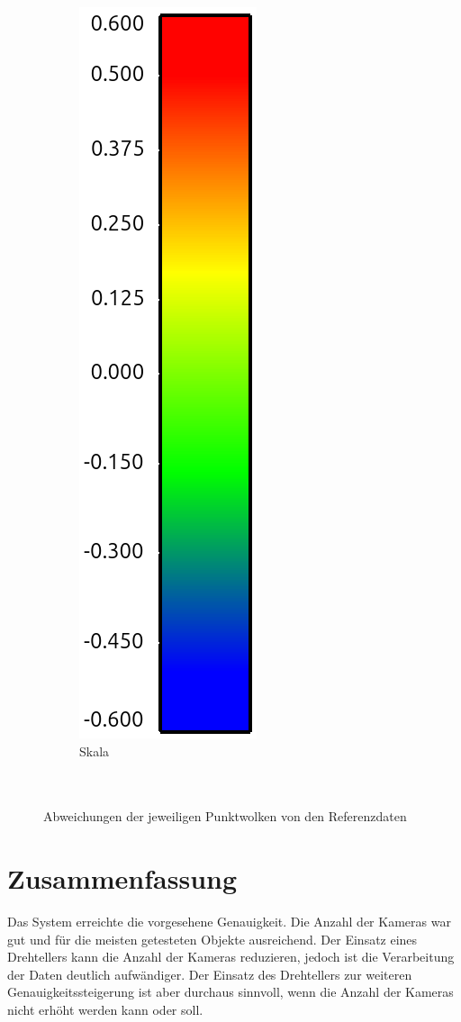 \documentclass[./00PhotoBox.tex]{subfiles}
\begin{document}
\begin{figure}
\begin{subfigure}{0.30\textwidth}
        \includegraphics[width=0.33\linewidth]{img/cam_anzahl/scala.png}
        \caption{Skala\\~\\~}
    \end{subfigure}

    \caption{Abweichungen der jeweiligen Punktwolken von den Referenzdaten}
    \label{img:ueberblick_cam_anzahl}
\end{figure}


\section{Zusammenfassung}
Das System erreichte die vorgesehene Genauigkeit. Die Anzahl der Kameras war gut und für die meisten getesteten Objekte ausreichend. Der Einsatz eines Drehtellers kann die Anzahl der Kameras reduzieren, jedoch ist die Verarbeitung der Daten deutlich aufwändiger. Der Einsatz des Drehtellers zur weiteren Genauigkeitssteigerung ist aber durchaus sinnvoll, wenn die Anzahl der Kameras nicht erhöht werden kann oder soll.

\biblio
\end{document}
